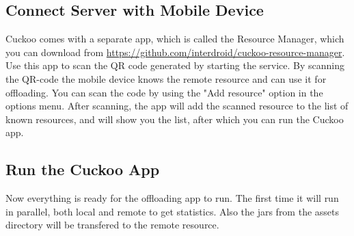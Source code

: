 \documentclass{article}
\begin{document}
\subsection{Connect Server with Mobile Device}
Cuckoo comes with a separate app, which is called the Resource Manager, which
you can download from
\url{https://github.com/interdroid/cuckoo-resource-manager}.
Use this app to scan the QR code generated by starting the service. By scanning
the QR-code the mobile device knows the remote resource and can use it for
offloading. You can scan the code by using the "Add resource" option in the
options menu. After scanning, the app will add the scanned resource to the list
of known resources, and will show you the list, after which you can run the
Cuckoo app.

\subsection{Run the Cuckoo App}
Now everything is ready for the offloading app to run. The first time it will
run in parallel, both local and remote to get statistics. Also the jars from the
assets directory will be transfered to the remote resource.
\end{document}
